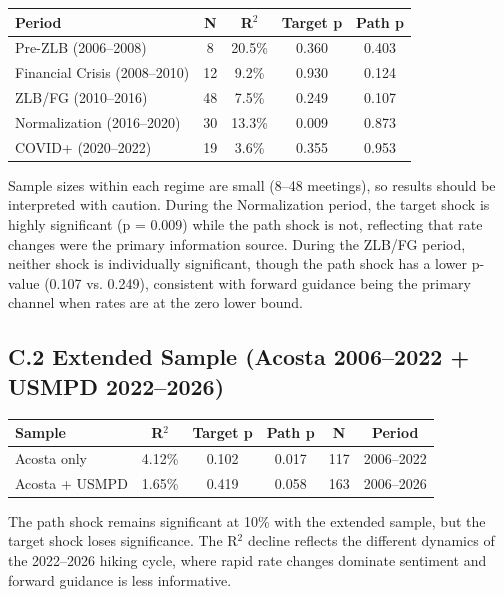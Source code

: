 \documentclass[12pt]{article}
\begin{document}
\begin{table}[htbp]
\centering
\begin{tabular}{lcccc}
\toprule
Period & N & R$^2$ & Target p & Path p \\
\midrule
Pre-ZLB (2006--2008) & 8 & 20.5\% & 0.360 & 0.403 \\
Financial Crisis (2008--2010) & 12 & 9.2\% & 0.930 & 0.124 \\
ZLB/FG (2010--2016) & 48 & 7.5\% & 0.249 & 0.107 \\
Normalization (2016--2020) & 30 & 13.3\% & 0.009 & 0.873 \\
COVID+ (2020--2022) & 19 & 3.6\% & 0.355 & 0.953 \\
\bottomrule
\end{tabular}
\end{table}

Sample sizes within each regime are small (8--48 meetings), so results should be interpreted with caution. During the Normalization period, the target shock is highly significant (p = 0.009) while the path shock is not, reflecting that rate changes were the primary information source. During the ZLB/FG period, neither shock is individually significant, though the path shock has a lower p-value (0.107 vs. 0.249), consistent with forward guidance being the primary channel when rates are at the zero lower bound.

\subsection{C.2 Extended Sample (Acosta 2006--2022 + USMPD 2022--2026)}

\begin{table}[htbp]
\centering
\begin{tabular}{lccccc}
\toprule
Sample & R$^2$ & Target p & Path p & N & Period \\
\midrule
Acosta only & 4.12\% & 0.102 & 0.017 & 117 & 2006--2022 \\
Acosta + USMPD & 1.65\% & 0.419 & 0.058 & 163 & 2006--2026 \\
\bottomrule
\end{tabular}
\end{table}

The path shock remains significant at 10\% with the extended sample, but the target shock loses significance. The R$^2$ decline reflects the different dynamics of the 2022--2026 hiking cycle, where rapid rate changes dominate sentiment and forward guidance is less informative.
\end{document}
